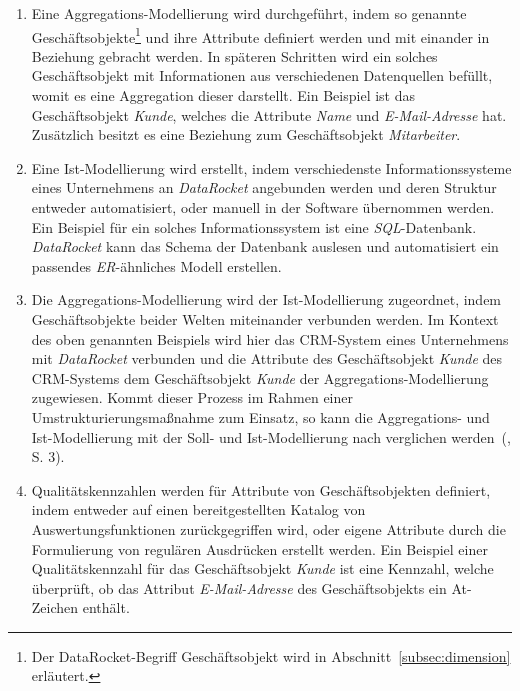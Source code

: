 \documentclass[
  language=german, %
  type=bachelor,%
  ngerman
]{isthesis}
\begin{document}
\begin{content}
	\begin{enumerate}
		\item Eine Aggregations-Modellierung wird durchgeführt, indem so genannte
		Geschäftsobjekte\footnote{Der DataRocket-Begriff Geschäftsobjekt wird in
		Abschnitt~\ref{subsec:dimension} erläutert.} und ihre Attribute definiert
		werden und mit einander in Beziehung gebracht werden. In späteren Schritten
		wird ein solches Geschäftsobjekt mit Informationen aus verschiedenen
		Datenquellen befüllt, womit es eine Aggregation dieser darstellt. Ein
		Beispiel ist das Geschäftsobjekt \textit{Kunde}, welches die Attribute
		\textit{Name} und \textit{E-Mail-Adresse} hat. Zusätzlich besitzt es eine
		Beziehung zum Geschäftsobjekt \textit{Mitarbeiter}. 

    \item Eine Ist-Modellierung wird erstellt, indem verschiedenste
      Informationssysteme eines Unternehmens an \textit{DataRocket} angebunden
      werden und deren Struktur entweder automatisiert, oder manuell in der
			Software übernommen werden. Ein Beispiel für ein solches
			Informationssystem ist eine \textit{SQL}-Datenbank. \textit{DataRocket}
			kann das Schema der Datenbank auslesen und automatisiert ein passendes
			\textit{\acrshort{ER}}-ähnliches Modell erstellen.

		\item Die Aggregations-Modellierung wird der Ist-Modellierung zugeordnet,
		indem Geschäftsobjekte beider Welten miteinander verbunden werden. Im
		Kontext des oben genannten Beispiels wird hier das \acrshort{CRM}-System
		eines Unternehmens mit \textit{DataRocket} verbunden und die Attribute des
		Geschäftsobjekt \textit{Kunde} des \acrshort{CRM}-Systems dem
		Geschäftsobjekt \textit{Kunde} der Aggregations-Modellierung zugewiesen.
		Kommt dieser Prozess \zB{} im Rahmen einer Umstrukturierungsmaßnahme
		zum Einsatz, so kann die Aggregations- und Ist-Modellierung mit der Soll-
		und Ist-Modellierung nach \textsc{\citeauthor{becker2006konzeptionelle}}
		verglichen werden~(\citeyear{becker2006konzeptionelle}, S. 3).

		\item Qualitätskennzahlen werden für Attribute von Geschäftsobjekten
		definiert, indem entweder auf einen bereitgestellten Katalog von
		Auswertungsfunktionen zurückgegriffen wird, oder eigene Attribute durch die
		Formulierung von regulären Ausdrücken erstellt werden. Ein Beispiel einer
		Qualitätskennzahl für das Geschäftsobjekt \textit{Kunde} ist eine Kennzahl,
		welche überprüft, ob das Attribut \textit{E-Mail-Adresse} des
		Geschäftsobjekts ein At-Zeichen enthält.


\end{enumerate}
\end{content}
\end{document}
